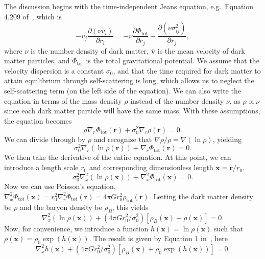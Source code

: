 The discussion begins with the time-independent Jeans equation, e.g.~Equation
4.209 of~\cite{binney_galactic_2008}, which is 
\begin{equation}
    - \overline{v}_j \frac{\partial (\nu \overline{v}_i)}{\partial r_i} 
    = - \nu \frac{\partial \Phi_{\text{tot}}}{\partial r_j} 
    - \frac{\partial (\nu \sigma_{ij}^2)}{\partial r_j},
\end{equation}
where $\nu$ is the number density of dark matter, $\overline{\mathbf{v}}$ is
the mean velocity of dark matter particles, and $\Phi_{\text{tot}}$ is the
total gravitational potential.  We assume that the velocity dispersion is a
constant $\sigma_0$, and that the time required for dark matter to attain
equilibrium through self-scattering is long, which allows us to neglect the
self-scattering term (on the left side of the equation).  We can also write
the equation in terms of the mass density $\rho$ instead of the number density
$\nu$, as $\rho \propto \nu$ since each dark matter particle will have the
same mass.  With these assumptions, the equation becomes
\begin{equation}
    \rho \nabla_r \Phi_{\text{tot}}(\mathbf{r}) + \sigma_0^2 \nabla_r
    \rho(\mathbf{r}) = 0.
\end{equation}
We can divide through by $\rho$ and recognize that $\nabla \rho / \rho = \nabla
(\ln \rho)$, yielding 
\begin{equation}
    \sigma_0^2 \nabla_r (\ln \rho(\mathbf{r})) + \nabla_r
    \Phi_{\text{tot}}(\mathbf{r}) = 0.
\end{equation}
We then take the derivative of the entire equation.  At this point, we can
introduce a length scale $r_0$ and corresponding dimensionless length
$\mathbf{x} = \mathbf{r} / r_0$.
\begin{equation}
    \sigma_0^2 \nabla_x^2 (\ln \rho(\mathbf{x})) + \nabla_x^2
    \Phi_{\text{tot}}(\mathbf{x}) = 0.
\end{equation}
Now we can use Poisson's equation, $\nabla_x^2 \Phi_{\text{tot}}(\mathbf{x}) =
r_0^2 \nabla_r^2 \Phi_{\text{tot}}(\mathbf{r}) = 4 \pi G r_0^2
\rho_{\text{tot}}(\mathbf{r})$.  Letting the dark matter density be $\rho$ and
the baryon density be $\rho_B$, this yields
\begin{equation}
    \nabla_x^2 (\ln \rho(\mathbf{x})) + (4 \pi G r_0^2/\sigma_0^2) \left[ \rho_B (\mathbf{x}) + \rho(\mathbf{x}) \right] = 0.
\end{equation}
Now, for convenience, we introduce a function $h(\mathbf{x}) = \ln
\rho(\mathbf{x})$ such that $\rho(\mathbf{x}) = \rho_0 \exp(h(\mathbf{x}))$.
The result is given by Equation 1 in~\cite{kaplinghat_tying_2014}, here
\begin{equation}
\nabla_x^2 h(\mathbf{x}) + (4\pi G r_0^2/\sigma_0^2)
\left[\rho_B(\mathbf{x}) + \rho_0 \exp\left(h(\mathbf{x})\right)\right] = 0.
\end{equation}

